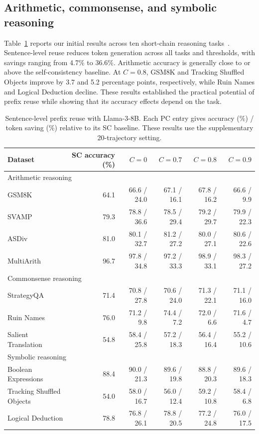 \subsection{Arithmetic, commonsense, and symbolic reasoning}
Table~\ref{tab:sentence_tasks} reports our initial results across ten short-chain reasoning tasks~\citep{cobbe2021training, patel2021nlp, miao2020diverse, roy2015solving,geva2021did,suzgun-etal-2023-challenging}. Sentence-level reuse reduces token generation across all tasks and thresholds, with savings ranging from 4.7\% to 36.6\%. Arithmetic accuracy is generally close to or above the self-consistency baseline. At $C=0.8$, GSM8K and Tracking Shuffled Objects improve by 3.7 and 5.2 percentage points, respectively, while Ruin Names and Logical Deduction decline. These results established the practical potential of prefix reuse while showing that its accuracy effects depend on the task.

\begin{table}[!htbp]
\centering\small
\caption{Sentence-level prefix reuse with Llama-3-8B. Each PC entry gives accuracy (\%) / token saving (\%) relative to its SC baseline. These results use the supplementary 20-trajectory setting.}
\label{tab:sentence_tasks}
\setlength{\tabcolsep}{4pt}
\begin{tabular}{@{}lrrrrr@{}}
\toprule
Dataset & SC accuracy (\%) & $C=0$ & $C=0.7$ & $C=0.8$ & $C=0.9$\\
\midrule
\multicolumn{6}{l}{Arithmetic reasoning}\\
GSM8K & 64.1 & 66.6 / 24.0 & 67.1 / 16.1 & 67.8 / 16.2 & 66.6 / 9.9\\
SVAMP & 79.3 & 78.8 / 36.6 & 78.5 / 29.4 & 79.2 / 29.7 & 79.9 / 22.3\\
ASDiv & 81.0 & 80.1 / 32.7 & 81.2 / 27.2 & 80.0 / 27.1 & 80.6 / 22.6\\
MultiArith & 96.7 & 97.8 / 34.8 & 97.2 / 33.3 & 98.9 / 33.1 & 98.3 / 27.2\\
\midrule
\multicolumn{6}{l}{Commonsense reasoning}\\
StrategyQA & 71.4 & 70.8 / 27.8 & 70.6 / 24.0 & 71.3 / 22.1 & 71.1 / 16.0\\
Ruin Names & 76.0 & 71.2 / 9.8 & 74.4 / 7.2 & 72.0 / 6.6 & 71.6 / 4.7\\
Salient Translation & 54.8 & 58.4 / 25.8 & 57.2 / 18.3 & 56.4 / 16.4 & 55.2 / 10.6\\
\midrule
\multicolumn{6}{l}{Symbolic reasoning}\\
Boolean Expressions & 88.4 & 90.0 / 21.3 & 89.6 / 19.8 & 88.8 / 20.3 & 89.6 / 18.3\\
Tracking Shuffled Objects & 54.0 & 58.0 / 16.7 & 56.0 / 12.4 & 59.2 / 10.8 & 58.4 / 6.8\\
Logical Deduction & 78.8 & 76.8 / 26.1 & 78.8 / 20.5 & 77.2 / 24.8 & 76.0 / 17.5\\
\bottomrule
\end{tabular}
\end{table}

